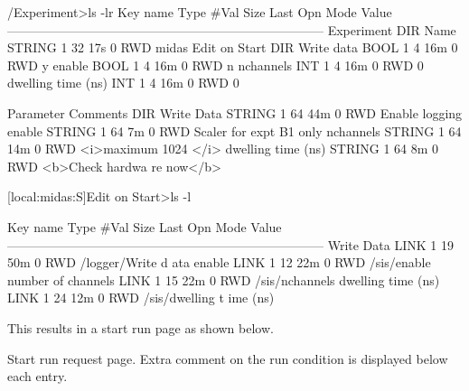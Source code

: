 \begin{DoxyCode}
/Experiment>ls -lr
Key name                        Type   #Val  Size  Last Opn Mode Value
---------------------------------------------------------------------------
Experiment                      DIR
    Name                        STRING  1     32    17s  0   RWD  midas
    Edit on Start               DIR
        Write data              BOOL    1     4     16m  0   RWD  y
        enable                  BOOL    1     4     16m  0   RWD  n
        nchannels               INT     1     4     16m  0   RWD  0
        dwelling time (ns)      INT     1     4     16m  0   RWD  0


    Parameter Comments          DIR
        Write Data              STRING  1     64    44m  0   RWD  Enable logging
        enable                  STRING  1     64    7m   0   RWD  Scaler for expt
       B1 only
        nchannels               STRING  1     64    14m  0   RWD  <i>maximum 1024
      </i>
        dwelling time (ns)      STRING  1     64    8m   0   RWD  <b>Check hardwa
      re now</b>

[local:midas:S]Edit on Start>ls -l

Key name                        Type   #Val  Size  Last Opn Mode Value
---------------------------------------------------------------------------
Write Data                      LINK    1     19    50m  0   RWD  /logger/Write d
      ata
enable                          LINK    1     12    22m  0   RWD  /sis/enable
number of channels              LINK    1     15    22m  0   RWD  /sis/nchannels
dwelling time (ns)              LINK    1     24    12m  0   RWD  /sis/dwelling t
      ime (ns)
\end{DoxyCode}


This results in a start run page as shown below.

\label{RC_mhttpd_Start_page_RC_param_comment_example}
\hypertarget{RC_mhttpd_Start_page_RC_param_comment_example}{}


\par
\par
\par
 \begin{center}  Start run request page. Extra comment on the run condition is displayed below each entry. \par
\par
\par
  \end{center}  \par
\par
\par




